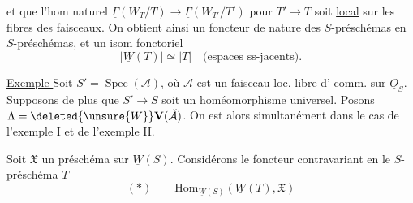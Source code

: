 et que l'hom naturel $\underline\Gamma(W_T/T)\to\underline\Gamma(W_{T'}/T')$ pour $T'\to T$  soit \uline{local} sur les fibres des faisceaux. On obtient ainsi un foncteur  de nature  des $S$-préschémas en $S$-préschémas, et un isom fonctoriel
\[
|\underline W(T)|\simeq|T|\quad\text{(espaces ss-jacents)}.
\]

\uline{Exemple } Soit $S'=\operatorname{Spec}(\mathcal A)$, où $\mathcal A$ est un faisceau loc. libre d' comm. sur $\underline O_S$. Supposons de plus que $S'\to S$ soit un homéomorphisme universel. Posons
$\Lambda=\deleted{\unsure{W}}\mathbf V(\check{\mathcal A})$.
On est alors simultanément dans le cas de l'exemple I et de l'exemple II.


Soit $\mathfrak X$ un préschéma sur $\underline W(S)$. Considérons le foncteur contravariant en le $S$-préschéma $T$
\[
(\ast)\qquad \mathrm{Hom}_{\underline W(S)}(\underline W(T),\mathfrak X)
\]
